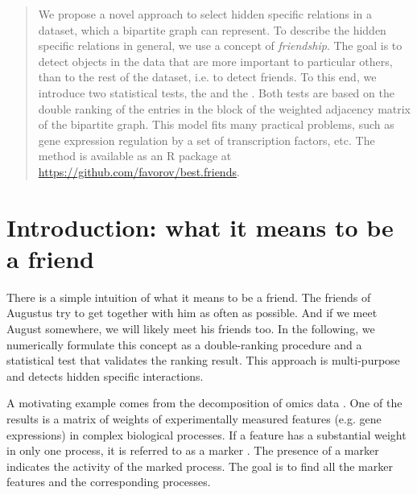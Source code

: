 \documentclass{llncs}
\begin{document}
\begin{abstract}
We propose a novel approach to select hidden specific relations in a dataset, which a bipartite graph can represent. 
To describe the hidden specific relations in general, we use a concept of \textit{friendship}. The goal is to detect objects in the data that are more important to particular others, than to the rest of the dataset, i.e. to detect friends. To this end, we introduce two statistical tests, the  and the . Both tests are based on the double ranking of the entries in the block of the weighted adjacency matrix of the bipartite graph. This model fits many practical problems, such as gene expression regulation by a set of transcription factors, etc. The method is available as an \textsf{R} package at \url{https://github.com/favorov/best.friends}.
\end{abstract}



\section{Introduction: what it means to be a friend}

There is a simple intuition of what it means to be a friend.  
The friends of Augustus try to get together with him as often as possible. And if we meet August somewhere, we will likely meet his friends too.
In the following, we numerically formulate this concept as a double-ranking procedure and a statistical test that validates the ranking result. This approach is multi-purpose and detects hidden specific interactions.

A motivating example comes from the decomposition of omics data 
\cite{fertig_cogaps_2010, stein-obrien_enter_2018}. One of the results is a matrix of weights of experimentally measured features (e.g. gene expressions) in complex biological processes. If a feature has a substantial weight in only one process, it is referred to as a marker \cite{stein-obrien_patternmarkers_2017}. 
The presence of a marker indicates the activity of the marked process.
The goal is to find all the marker features and the corresponding processes.
\end{document}
